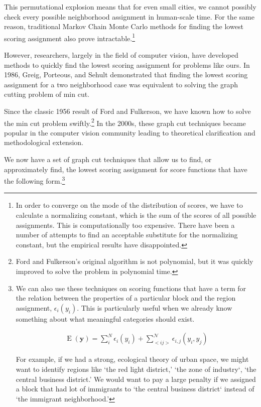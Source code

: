 This permutational explosion means that for even small cities, we
cannot possibly check every possible neighborhood assignment in
human-scale time. For the same reason, traditional Markov Chain Monte
Carlo methods for finding the lowest scoring assignment also prove
intractable.\footnote{In order to converge on the mode of the
  distribution of scores, we have to calculate a normalizing constant,
  which is the sum of the scores of all possible assignments. This is
  computationally too expensive. There have been a number of attempts
  to find an acceptable substitute for the normalizing constant, but
  the empirical results have disappointed.\cite{li_mrf_2009}}

However, researchers, largely in the field of computer vision, have
developed methods to quickly find the lowest scoring assignment for
problems like ours. In 1986, Greig, Porteous, and Sehult demonstrated
that finding the lowest scoring assignment for a two neighborhood case
was equivalent to solving the graph cutting problem of min
cut.\cite{greig_exact_1989}

 Since the classic 1956 result of Ford and Fulkerson, we have known
 how to solve the min cut problem swiftly.\footnote{Ford and Fulkerson's
   original algorithm is not polynomial, but it was quickly improved
   to solve the problem in polynomial time.\cite{ford_maximal_1956}}
 In the 2000s, these graph cut techniques became popular in the
 computer vision community leading to theoretical
 clarification and methodological extension.\cite{kolmogorov_what_2004}

We now have a set of graph cut techniques that allow us to find, or
approximately find, the lowest scoring assignment for score functions
that have the following form.\footnote{We can also use these
  techniques on scoring functions that have a term for the relation
  between the properties of a particular block and the region
  assignment, $\epsilon_i(y_i)$. This is particularly useful when we
  already know something about what meaningful categories should exist.

  \begin{align}
    \operatorname{E}(\mathbf{y}) = \sum_i^N\epsilon_i(y_i) + \sum_{<i j>}^{\mathcal{N}}\epsilon_{i,j}(y_i,y_j)
  \end{align}

  For example, if we had a strong, ecological theory of urban space,
  we might want to identify regions like `the red light district,'
  `the zone of industry`, `the central business district.' We would
  want to pay a large penalty if we assigned a block that had lot of
  immigrants to `the central business district` instead of `the
  immigrant neighborhood.'
}

